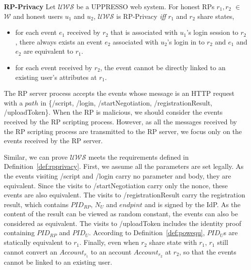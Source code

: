 \begin{definition}
\noindent\textbf{RP-Privacy} Let $\mathcal{UWS}$ be a UPPRESSO web system. For honest RPs $r_1, r_2$ $\in$ $\mathcal{W}$ and honest users $u_1$ and $u_2$, $\mathcal{UWS}$ is RP-Privacy {\em iff} $r_1$ and $r_2$ share states,
\vspace{-\topsep}
\begin{itemize}
\setlength{\itemsep}{0pt plus 1pt}
\item for each event $e_1$ received by $r_2$ that is associated with $u_1$'s login session to $r_2$, there always exists an event $e_2$ associated with $u_2$'s login in to $r_2$ and $e_1$ and $e_2$ are equivalent to $r_1$.
\item for each event received by $r_2$, the event cannot be directly linked to an existing user's attributes at $r_1$.
\end{itemize}
\label{def:rpprivacy}
\end{definition}
\vspace{-\topsep}
The RP server process accepts the events whose message is an HTTP request with a $path$ in {\sf \{/script, /login, /startNegotiation,  /registrationResult, /uploadToken\}}. When the RP is malicious, we should consider the events received by the RP scripting process. However, as all the messages received by the RP scripting process are transmitted to the RP server, we focus only on the events received by the RP server.

Similar, we can prove $\mathcal{UWS}$ meets the requirements defined in Definition~\ref{def:rpprivacy}. First, we assume all the parameters are set legally. As the events visiting {\sf /script} and {\sf /login} carry no parameter and body, they are equivalent. Since the visits to {\sf /startNegotiation} carry only the nonce, these events are also equivalent. The visits to {\sf /registrationResult} carry the registration result, which contains $PID_{RP}$, $N_U$ and $endpint$ and is signed by the IdP. As the content of the result can be viewed as random constant, the events can also be considered as equivalent. The visits to {\sf /uploadToken} includes the identity proof containing $PID_{RP}$ and $PID_U$. According to Definition~\ref{def:powequ}, $PID_U$s are statically equivalent to $r_1$. Finally, even when $r_2$ share state with $r_1$, $r_1$ still cannot convert an $Account_{r_1}$ to an account $Account_{r_2}$ at $r_2$, so that the events cannot be linked to an existing user. %

